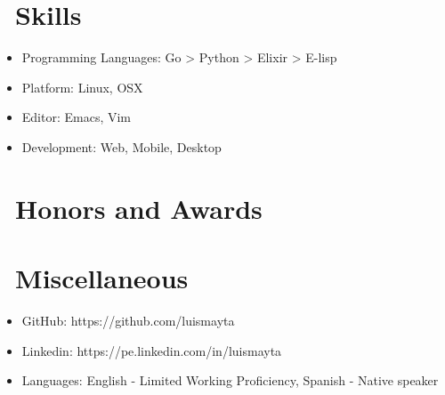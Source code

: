 \documentclass{resume}
\begin{document}
\section{\faCogs\ Skills}
\begin{itemize}[parsep=0.5ex]
  \item Programming Languages: Go > Python > Elixir > E-lisp
  \item Platform: Linux, OSX
  \item Editor: Emacs, Vim
  \item Development: Web, Mobile, Desktop
\end{itemize}

\section{\faHeartO\ Honors and Awards}

\section{\faInfo\ Miscellaneous}
\begin{itemize}[parsep=0.5ex]
  \item GitHub: https://github.com/luismayta
  \item Linkedin: https://pe.linkedin.com/in/luismayta
  \item Languages: English - Limited Working Proficiency, Spanish - Native speaker
\end{itemize}

%
%
\end{document}
